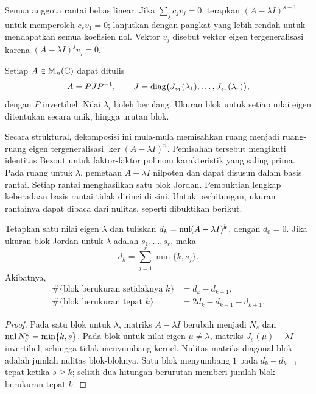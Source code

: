 Semua anggota rantai bebas linear. Jika $\sum_jc_jv_j=0$, terapkan
$(A-\lambda I)^{s-1}$ untuk memperoleh $c_sv_1=0$;
lanjutkan dengan pangkat yang lebih rendah untuk mendapatkan semua
koefisien nol. Vektor $v_j$ disebut vektor eigen tergeneralisasi karena
$(A-\lambda I)^jv_j=0$.

\begin{teorema}
    Setiap $A\in\mathbb{M}_n(\mathbb{C})$ dapat ditulis
    \[
        A=PJP^{-1},\qquad
        J=\operatorname{diag}\bigl(J_{s_1}(\lambda_1),\ldots,J_{s_r}(\lambda_r)\bigr),
    \]
    dengan $P$ invertibel. Nilai $\lambda_i$ boleh berulang.
    Ukuran blok untuk setiap nilai eigen ditentukan secara unik,
    hingga urutan blok.
\end{teorema}

Secara struktural, dekomposisi ini mula-mula memisahkan ruang menjadi
ruang-ruang eigen tergeneralisasi $\ker(A-\lambda I)^n$.
Pemisahan tersebut mengikuti identitas Bezout untuk faktor-faktor
polinom karakteristik yang saling prima.
Pada ruang untuk $\lambda$, pemetaan $A-\lambda I$ nilpoten dan
dapat disusun dalam basis rantai. Setiap rantai menghasilkan satu
blok Jordan. Pembuktian lengkap keberadaan basis rantai
tidak dirinci di sini.
Untuk perhitungan, ukuran rantainya dapat dibaca dari nulitas,
seperti dibuktikan berikut.

\begin{teorema}
    Tetapkan satu nilai eigen $\lambda$ dan tuliskan
    $d_k=\operatorname{nul}(A-\lambda I)^k$, dengan $d_0=0$.
    Jika ukuran blok Jordan untuk $\lambda$ adalah $s_1,\ldots,s_r$, maka
    \[
        d_k=\sum_{j=1}^r\min\{k,s_j\}.
    \]
    Akibatnya,
    \begin{align*}
        \#\{\text{blok berukuran setidaknya }k\}&=d_k-d_{k-1},\\
        \#\{\text{blok berukuran tepat }k\}&=2d_k-d_{k-1}-d_{k+1}.
    \end{align*}
\end{teorema}
\begin{proof}
    Pada satu blok untuk $\lambda$, matriks $A-\lambda I$
    berubah menjadi $N_s$ dan $\operatorname{nul} N_s^k=\min\{k,s\}$.
    Pada blok untuk nilai eigen $\mu\ne\lambda$, matriks
    $J_s(\mu)-\lambda I$ invertibel, sehingga tidak menyumbang kernel.
    Nulitas matriks diagonal blok adalah jumlah nulitas blok-bloknya.
    Satu blok menyumbang $1$ pada $d_k-d_{k-1}$ tepat ketika $s\ge k$;
    selisih dua hitungan berurutan memberi jumlah blok berukuran tepat $k$.
\end{proof}

